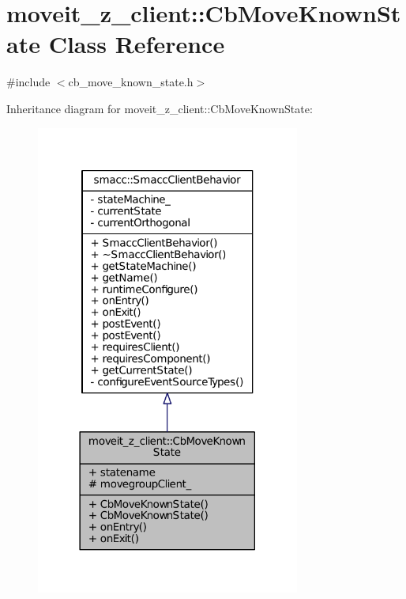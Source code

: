 \hypertarget{classmoveit__z__client_1_1CbMoveKnownState}{}\section{moveit\+\_\+z\+\_\+client\+:\+:Cb\+Move\+Known\+State Class Reference}
\label{classmoveit__z__client_1_1CbMoveKnownState}


{\ttfamily \#include $<$cb\+\_\+move\+\_\+known\+\_\+state.\+h$>$}



Inheritance diagram for moveit\+\_\+z\+\_\+client\+:\+:Cb\+Move\+Known\+State\+:
\nopagebreak
\begin{figure}[H]
\begin{center}
\leavevmode
\includegraphics[width=246pt]{classmoveit__z__client_1_1CbMoveKnownState__inherit__graph}
\end{center}
\end{figure}


